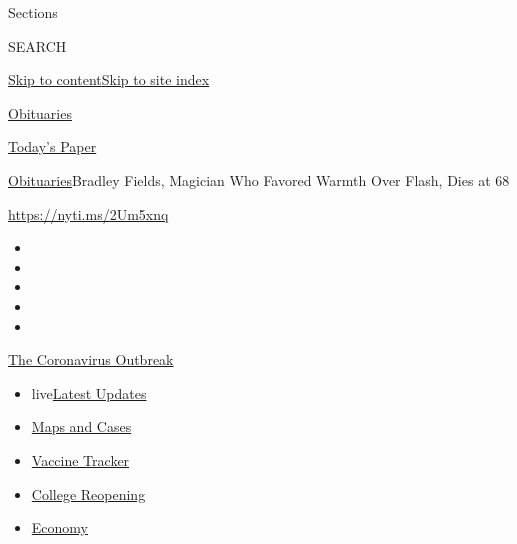 Sections

SEARCH

\protect\hyperlink{site-content}{Skip to
content}\protect\hyperlink{site-index}{Skip to site index}

\href{https://www.nytimes.com/section/obituaries}{Obituaries}

\href{https://myaccount.nytimes.com/auth/login?response_type=cookie\&client_id=vi}{}

\href{https://www.nytimes.com/section/todayspaper}{Today's Paper}

\href{/section/obituaries}{Obituaries}\textbar{}Bradley Fields, Magician
Who Favored Warmth Over Flash, Dies at 68

\url{https://nyti.ms/2Um5xnq}

\begin{itemize}
\item
\item
\item
\item
\item
\end{itemize}

\href{https://www.nytimes.com/news-event/coronavirus?action=click\&pgtype=Article\&state=default\&region=TOP_BANNER\&context=storylines_menu}{The
Coronavirus Outbreak}

\begin{itemize}
\tightlist
\item
  live\href{https://www.nytimes.com/2020/08/03/world/coronavirus-covid-19.html?action=click\&pgtype=Article\&state=default\&region=TOP_BANNER\&context=storylines_menu}{Latest
  Updates}
\item
  \href{https://www.nytimes.com/interactive/2020/us/coronavirus-us-cases.html?action=click\&pgtype=Article\&state=default\&region=TOP_BANNER\&context=storylines_menu}{Maps
  and Cases}
\item
  \href{https://www.nytimes.com/interactive/2020/science/coronavirus-vaccine-tracker.html?action=click\&pgtype=Article\&state=default\&region=TOP_BANNER\&context=storylines_menu}{Vaccine
  Tracker}
\item
  \href{https://www.nytimes.com/2020/08/02/us/covid-college-reopening.html?action=click\&pgtype=Article\&state=default\&region=TOP_BANNER\&context=storylines_menu}{College
  Reopening}
\item
  \href{https://www.nytimes.com/live/2020/08/03/business/stock-market-today-coronavirus?action=click\&pgtype=Article\&state=default\&region=TOP_BANNER\&context=storylines_menu}{Economy}
\end{itemize}

